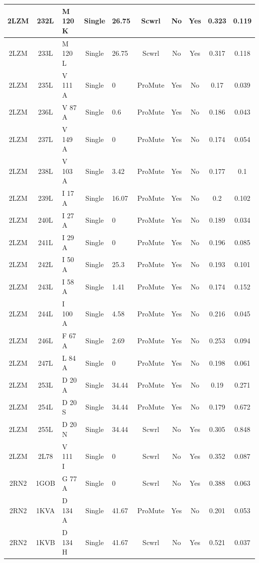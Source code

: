 \documentclass[sigconf]{acmart}
\begin{document}
\begin{table}[]
{\begin{tabular}{|c|c|p{2.8cm}|c|p{2.8cm}|c|c|c|c|c|}
		2LZM & 232L & M 120 K & Single & 26.75 & Scwrl & No & Yes & 0.323 & 0.119 \\ \hline
		2LZM & 233L & M 120 L & Single & 26.75 & Scwrl & No & Yes & 0.317 & 0.118 \\ \hline
		2LZM & 235L & V 111 A & Single & 0 & ProMute & Yes & No & 0.17 & 0.039 \\ \hline
		2LZM & 236L & V 87 A & Single & 0.6 & ProMute & Yes & No & 0.186 & 0.043 \\ \hline
		2LZM & 237L & V 149 A & Single & 0 & ProMute & Yes & No & 0.174 & 0.054 \\ \hline
		2LZM & 238L & V 103 A & Single & 3.42 & ProMute & Yes & No & 0.177 & 0.1 \\ \hline
		2LZM & 239L & I 17 A & Single & 16.07 & ProMute & Yes & No & 0.2 & 0.102 \\ \hline
		2LZM & 240L & I 27 A & Single & 0 & ProMute & Yes & No & 0.189 & 0.034 \\ \hline
		2LZM & 241L & I 29 A & Single & 0 & ProMute & Yes & No & 0.196 & 0.085 \\ \hline
		2LZM & 242L & I 50 A & Single & 25.3 & ProMute & Yes & No & 0.193 & 0.101 \\ \hline
		2LZM & 243L & I 58 A & Single & 1.41 & ProMute & Yes & No & 0.174 & 0.152 \\ \hline
		2LZM & 244L & I 100 A & Single & 4.58 & ProMute & Yes & No & 0.216 & 0.045 \\ \hline
		2LZM & 246L & F 67 A & Single & 2.69 & ProMute & Yes & No & 0.253 & 0.094 \\ \hline
		2LZM & 247L & L 84 A & Single & 0 & ProMute & Yes & No & 0.198 & 0.061 \\ \hline
		2LZM & 253L & D 20 A & Single & 34.44 & ProMute & Yes & No & 0.19 & 0.271 \\ \hline
		2LZM & 254L & D 20 S & Single & 34.44 & ProMute & Yes & No & 0.179 & 0.672 \\ \hline
		2LZM & 255L & D 20 N & Single & 34.44 & Scwrl & No & Yes & 0.305 & 0.848 \\ \hline
		2LZM & 2L78 & V 111 I & Single & 0 & Scwrl & No & Yes & 0.352 & 0.087 \\ \hline
		2RN2 & 1GOB & G 77 A & Single & 0 & Scwrl & No & Yes & 0.388 & 0.063 \\ \hline
		2RN2 & 1KVA & D 134 A & Single & 41.67 & ProMute & Yes & No & 0.201 & 0.053 \\ \hline
		2RN2 & 1KVB & D 134 H & Single & 41.67 & Scwrl & No & Yes & 0.521 & 0.037 \\ \hline

\end{tabular}}
\end{table}
\end{document}
